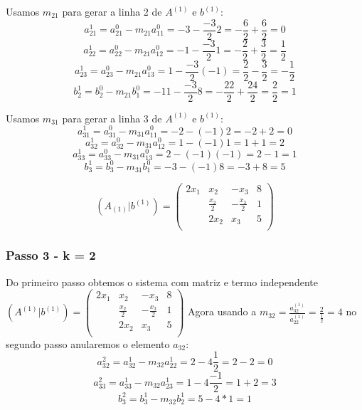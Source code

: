 \documentclass{article}
\begin{document}
            Usamos $m_21$ para gerar a linha 2 de $A^{(1)}$ e $b^{(1)}$:
            \[
                a^{1}_{21} = a^{0}_{21} - m_{21}a^{0}_{11} = -3 - \frac{-3}{2}2 = -\frac{6}{2} + \frac{6}{2} = 0
            \]
            \[
                a^{1}_{22} = a^{0}_{22} - m_{21}a^{0}_{12} = -1 - \frac{-3}{2}1 = -\frac{2}{2} + \frac{3}{2} = \frac{1}{2}
            \]
            \[
                a^{1}_{23} = a^{0}_{23} - m_{21}a^{0}_{13} = 1 - \frac{-3}{2}(-1) = \frac{2}{2} - \frac{3}{2} = -\frac{1}{2}
            \]
            \[
                b^{1}_{2} = b^{0}_{2} - m_{21}b^{0}_{1} = -11 - \frac{-3}{2}8 = -\frac{22}{2} + \frac{24}{2} = \frac{2}{2} = 1 
            \]

            Usamos $m_31$ para gerar a linha 3 de $A^{(1)}$ e $b^{(1)}$:
            \[
                a^{1}_{31} = a^{0}_{31} - m_{31}a^{0}_{11} = -2 - (-1)2 = -2 + 2 = 0
            \]
            \[
                a^{1}_{32} = a^{0}_{32} - m_{31}a^{0}_{12} = 1 - (-1)1 = 1 + 1 = 2
            \]
            \[
                a^{1}_{33} = a^{0}_{33} - m_{31}a^{0}_{13} = 2 - (-1)(-1) = 2 - 1 = 1
            \]
            \[
                b^{1}_{3} = b^{0}_{3} - m_{31}b^{0}_{1} = -3 - (-1)8 = -3 + 8 = 5
            \]

            \[
                (A_{(1)}|b^{(1)}) =
                \left(
                    \begin{array}{ccc|c}
                        2x_1 & x_2 & -x_3 & 8 \\
                         & \frac{x_2}{2} & -\frac{x_3}{2} & 1 \\
                         & 2x_2 & x_3 & 5 \\
                    \end{array}
                \right)
            \]

    \subsubsection{Passo 3 - k = 2}
        Do primeiro passo obtemos o sistema com matriz e termo independente $(A^{(1)}|b^{(1)}) = \left(
                    \begin{array}{ccc|c}
                        2x_1 & x_2 & -x_3 & 8 \\
                         & \frac{x_2}{2} & -\frac{x_3}{2} & 1 \\
                         & 2x_2 & x_3 & 5 \\
                    \end{array}
                \right)$ Agora usando a $m_{32} = \frac{a^{(1)}_{32}}{a^{(1)}_{22}} = \frac{2}{\frac{1}{2}} = 4$ no segundo passo anularemos o elemento $a_{32}$:
            \[
                a^{2}_{32} = a^{1}_{32} - m_{32}a^{1}_{22} = 2 - 4\frac{1}{2} = 2 - 2 = 0
            \]
            \[
                a^{2}_{33} = a^{1}_{33} - m_{32}a^{1}_{23} = 1 - 4\frac{-1}{2} = 1 + 2 = 3
            \]
            \[
                b^{2}_{3} = b^{1}_{3} - m_{32}b^{1}_{2} = 5 - 4*1 = 1 
            \]
\end{document}
